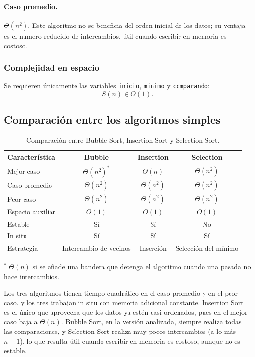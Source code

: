 \documentclass[11pt,letterpaper]{article}
\begin{document}
\paragraph{Caso promedio.} $\Theta(n^2)$. Este algoritmo no se beneficia del orden inicial de los datos; su ventaja es el número reducido de intercambios, útil cuando escribir en memoria es costoso.

\subsubsection{Complejidad en espacio}

Se requieren únicamente las variables \texttt{inicio}, \texttt{minimo} y \texttt{comparando}:
\[
  S(n) \in O(1).
\]

\subsection{Comparación entre los algoritmos simples}

\begin{table}[htbp]
  \centering
  \caption{Comparación entre Bubble Sort, Insertion Sort y Selection Sort.}
  \begin{tabular}{lccc}
    \toprule
    \textbf{Característica} & \textbf{Bubble} & \textbf{Insertion} & \textbf{Selection} \\
    \midrule
    Mejor caso       & $\Theta(n^2)^{*}$ & $\Theta(n)$   & $\Theta(n^2)$ \\
    Caso promedio    & $\Theta(n^2)$     & $\Theta(n^2)$ & $\Theta(n^2)$ \\
    Peor caso        & $\Theta(n^2)$     & $\Theta(n^2)$ & $\Theta(n^2)$ \\
    Espacio auxiliar & $O(1)$            & $O(1)$        & $O(1)$ \\
    Estable          & Sí                & Sí            & No \\
    In situ          & Sí                & Sí            & Sí \\
    Estrategia       & Intercambio de vecinos & Inserción & Selección del mínimo \\
    \bottomrule
  \end{tabular}

  \smallskip
  {\footnotesize $^{*}$ $\Theta(n)$ si se añade una bandera que detenga el algoritmo cuando una pasada no hace intercambios.}
\end{table}

Los tres algoritmos tienen tiempo cuadrático en el caso promedio y en el peor caso, y los tres trabajan in situ con memoria adicional constante. Insertion Sort es el único que aprovecha que los datos ya estén casi ordenados, pues en el mejor caso baja a $\Theta(n)$. Bubble Sort, en la versión analizada, siempre realiza todas las comparaciones, y Selection Sort realiza muy pocos intercambios (a lo más $n-1$), lo que resulta útil cuando escribir en memoria es costoso, aunque no es estable.
\end{document}
